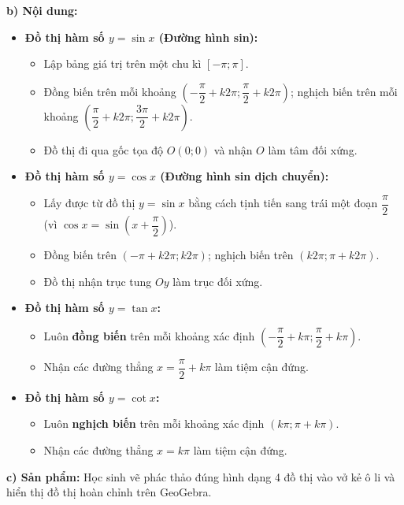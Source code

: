 \documentclass[12pt, a4paper]{article}
\begin{document}
\textbf{b) Nội dung:}
\begin{itemize}[leftmargin=0.6cm]
    \item \textbf{Đồ thị hàm số $y = \sin x$ (Đường hình sin):}
    \begin{itemize}[leftmargin=0.5cm]
        \item Lập bảng giá trị trên một chu kì $[-\pi; \pi]$.
        \item Đồng biến trên mỗi khoảng $\left(-\dfrac{\pi}{2} + k2\pi; \dfrac{\pi}{2} + k2\pi\right)$; nghịch biến trên mỗi khoảng $\left(\dfrac{\pi}{2} + k2\pi; \dfrac{3\pi}{2} + k2\pi\right)$.
        \item Đồ thị đi qua gốc tọa độ $O(0; 0)$ và nhận $O$ làm tâm đối xứng.
    \end{itemize}
    \item \textbf{Đồ thị hàm số $y = \cos x$ (Đường hình sin dịch chuyển):}
    \begin{itemize}[leftmargin=0.5cm]
        \item Lấy được từ đồ thị $y = \sin x$ bằng cách tịnh tiến sang trái một đoạn $\dfrac{\pi}{2}$ (vì $\cos x = \sin\left(x + \dfrac{\pi}{2}\right)$).
        \item Đồng biến trên $(-\pi + k2\pi; k2\pi)$; nghịch biến trên $(k2\pi; \pi + k2\pi)$.
        \item Đồ thị nhận trục tung $Oy$ làm trục đối xứng.
    \end{itemize}
    \item \textbf{Đồ thị hàm số $y = \tan x$:}
    \begin{itemize}[leftmargin=0.5cm]
        \item Luôn \textbf{đồng biến} trên mỗi khoảng xác định $\left(-\dfrac{\pi}{2} + k\pi; \dfrac{\pi}{2} + k\pi\right)$.
        \item Nhận các đường thẳng $x = \dfrac{\pi}{2} + k\pi$ làm tiệm cận đứng.
    \end{itemize}
    \item \textbf{Đồ thị hàm số $y = \cot x$:}
    \begin{itemize}[leftmargin=0.5cm]
        \item Luôn \textbf{nghịch biến} trên mỗi khoảng xác định $(k\pi; \pi + k\pi)$.
        \item Nhận các đường thẳng $x = k\pi$ làm tiệm cận đứng.
    \end{itemize}
\end{itemize}

\textbf{c) Sản phẩm:} Học sinh vẽ phác thảo đúng hình dạng 4 đồ thị vào vở kẻ ô li và hiển thị đồ thị hoàn chỉnh trên GeoGebra.
\end{document}
